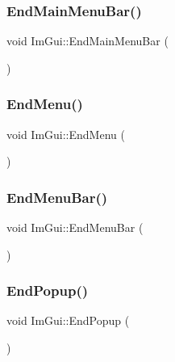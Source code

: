 \hypertarget{namespace_im_gui_ab92f330c808546b340eb7bdf7e5f7c95}{}\label{namespace_im_gui_ab92f330c808546b340eb7bdf7e5f7c95} 
\subsubsection{\texorpdfstring{End\+Main\+Menu\+Bar()}{EndMainMenuBar()}}
{\footnotesize\ttfamily void Im\+Gui\+::\+End\+Main\+Menu\+Bar (\begin{DoxyParamCaption}{ }\end{DoxyParamCaption})}

\hypertarget{namespace_im_gui_a1448a5a4e8c431c15f991e9255c0df95}{}\label{namespace_im_gui_a1448a5a4e8c431c15f991e9255c0df95} 
\subsubsection{\texorpdfstring{End\+Menu()}{EndMenu()}}
{\footnotesize\ttfamily void Im\+Gui\+::\+End\+Menu (\begin{DoxyParamCaption}{ }\end{DoxyParamCaption})}

\hypertarget{namespace_im_gui_aa226265c140eb6ee375c5b9abc69c4fc}{}\label{namespace_im_gui_aa226265c140eb6ee375c5b9abc69c4fc} 
\subsubsection{\texorpdfstring{End\+Menu\+Bar()}{EndMenuBar()}}
{\footnotesize\ttfamily void Im\+Gui\+::\+End\+Menu\+Bar (\begin{DoxyParamCaption}{ }\end{DoxyParamCaption})}

\hypertarget{namespace_im_gui_aa6a9b5696f2ea7eed7683425fc77b8f2}{}\label{namespace_im_gui_aa6a9b5696f2ea7eed7683425fc77b8f2} 
\subsubsection{\texorpdfstring{End\+Popup()}{EndPopup()}}
{\footnotesize\ttfamily void Im\+Gui\+::\+End\+Popup (\begin{DoxyParamCaption}{ }\end{DoxyParamCaption})}

